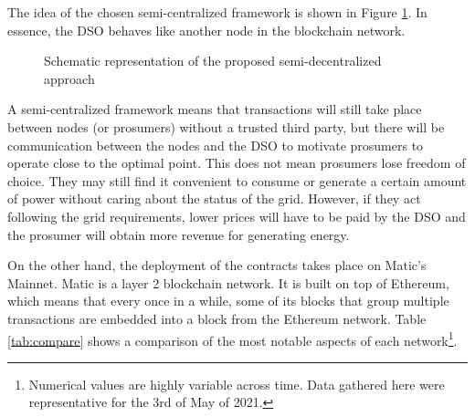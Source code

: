 The idea of the chosen semi-centralized framework is shown in Figure \ref{fig:central2}. In essence, the DSO behaves like another node in the blockchain network.

\begin{figure}[!htb]\centering
    \caption{Schematic representation of the proposed semi-decentralized approach}
    \label{fig:central2}
\end{figure}


A semi-centralized framework means that transactions will still take place between nodes (or prosumers) without a trusted third party, but there will be communication between the nodes and the DSO to motivate prosumers to operate close to the optimal point. This does not mean prosumers lose freedom of choice. They may still find it convenient to consume or generate a certain amount of power without caring about the status of the grid. However, if they act following the grid requirements, lower prices will have to be paid by the DSO and the prosumer will obtain more revenue for generating energy.  

On the other hand, the deployment of the contracts takes place on Matic's Mainnet. Matic is a layer 2 blockchain network. It is built on top of Ethereum, which means that every once in a while, some of its blocks that group multiple transactions are embedded into a block from the Ethereum network. Table \ref{tab:compare} shows a comparison of the most notable aspects of each network\footnote{Numerical values are highly variable across time. Data gathered here were representative for the 3rd of May of 2021.}.

